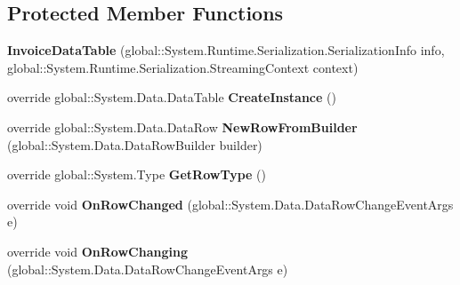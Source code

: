 \subsection*{Protected Member Functions}
\begin{DoxyCompactItemize}
\item 
{\bfseries Invoice\+Data\+Table} (global\+::\+System.\+Runtime.\+Serialization.\+Serialization\+Info info, global\+::\+System.\+Runtime.\+Serialization.\+Streaming\+Context context)\hypertarget{class_products_1_1_data_1_1ds_sage_1_1_invoice_data_table_a6ebe688d095cae4e3b6ef781e514a613}{}\label{class_products_1_1_data_1_1ds_sage_1_1_invoice_data_table_a6ebe688d095cae4e3b6ef781e514a613}

\item 
override global\+::\+System.\+Data.\+Data\+Table {\bfseries Create\+Instance} ()\hypertarget{class_products_1_1_data_1_1ds_sage_1_1_invoice_data_table_a53edf4664964c5847b740d7217c7bf38}{}\label{class_products_1_1_data_1_1ds_sage_1_1_invoice_data_table_a53edf4664964c5847b740d7217c7bf38}

\item 
override global\+::\+System.\+Data.\+Data\+Row {\bfseries New\+Row\+From\+Builder} (global\+::\+System.\+Data.\+Data\+Row\+Builder builder)\hypertarget{class_products_1_1_data_1_1ds_sage_1_1_invoice_data_table_a006cf7cfc676225690f11d28dfe2e73d}{}\label{class_products_1_1_data_1_1ds_sage_1_1_invoice_data_table_a006cf7cfc676225690f11d28dfe2e73d}

\item 
override global\+::\+System.\+Type {\bfseries Get\+Row\+Type} ()\hypertarget{class_products_1_1_data_1_1ds_sage_1_1_invoice_data_table_ab552dd8b981317c1ddcb69ecbeeb2a9b}{}\label{class_products_1_1_data_1_1ds_sage_1_1_invoice_data_table_ab552dd8b981317c1ddcb69ecbeeb2a9b}

\item 
override void {\bfseries On\+Row\+Changed} (global\+::\+System.\+Data.\+Data\+Row\+Change\+Event\+Args e)\hypertarget{class_products_1_1_data_1_1ds_sage_1_1_invoice_data_table_a9d3ad921e938796f595e5e2ef7ec694b}{}\label{class_products_1_1_data_1_1ds_sage_1_1_invoice_data_table_a9d3ad921e938796f595e5e2ef7ec694b}

\item 
override void {\bfseries On\+Row\+Changing} (global\+::\+System.\+Data.\+Data\+Row\+Change\+Event\+Args e)\hypertarget{class_products_1_1_data_1_1ds_sage_1_1_invoice_data_table_a2cc7312ac52267641b7dc522d83180f2}{}\label{class_products_1_1_data_1_1ds_sage_1_1_invoice_data_table_a2cc7312ac52267641b7dc522d83180f2}


\end{DoxyCompactItemize}
